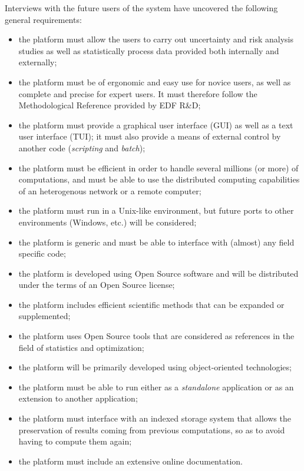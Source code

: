 Interviews with the future users of the system have uncovered the following general requirements:
\begin{itemize}
\item the platform must allow the users to carry out uncertainty and risk analysis studies as well as statistically process data provided both internally and externally;
\item the platform must be of ergonomic and easy use for novice users, as well as complete and precise for expert users. It must therefore follow the Methodological Reference \cite{OTmeth} provided by EDF R\&D;
\item the platform must provide a graphical user interface (GUI) as well as a text user interface (TUI); it must also provide a means of external control by another code (\emph{scripting} and \emph{batch});
\item the platform must be efficient in order to handle several millions (or more) of computations, and must be able to use the distributed computing capabilities of an heterogenous network or a remote computer;
\item the platform must run in a Unix-like environment, but future ports to other environments (Windows, etc.) will be considered;
\item the platform is generic and must be able to interface with (almost) any field specific code;
\item the platform is developed using Open Source software and will be distributed under the terms of an Open Source license;
\item the platform includes efficient scientific methods that can be expanded or supplemented;
\item the platform uses Open Source tools that are considered as references in the field of statistics and optimization;
\item the platform will be primarily developed using object-oriented technologies;
\item the platform must be able to run either as a \emph{standalone} application or as an extension to another application;
\item the platform must interface with an indexed storage system that allows the preservation of results coming from previous computations, so as to avoid having to compute them again;
\item the platform must include an extensive online documentation.
\end{itemize}

